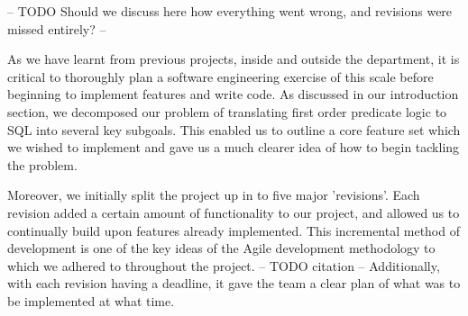 \documentclass[a4wide, 11pt]{article}
\begin{document}
-- TODO Should we discuss here how everything went wrong, and revisions were
missed entirely? --

As we have learnt from previous projects, inside and outside the department, it
is critical to thoroughly plan a software engineering exercise of this scale
before beginning to implement features and write code. As discussed in our
introduction section, we decomposed our problem of translating first order
predicate logic to SQL into several key subgoals. This enabled us to outline a
core feature set which we wished to implement and gave us a much clearer idea
of how to begin tackling the problem.

Moreover, we initially split the project up in to five major 'revisions'. Each
revision added a certain amount of functionality to our project, and allowed us
to continually build upon features already implemented. This incremental method
of development is one of the key ideas of the Agile development methodology to
which we adhered to throughout the project. -- TODO citation -- Additionally,
with each revision having a deadline, it gave the team a clear plan of what was
to be implemented at what time.
\end{document}
